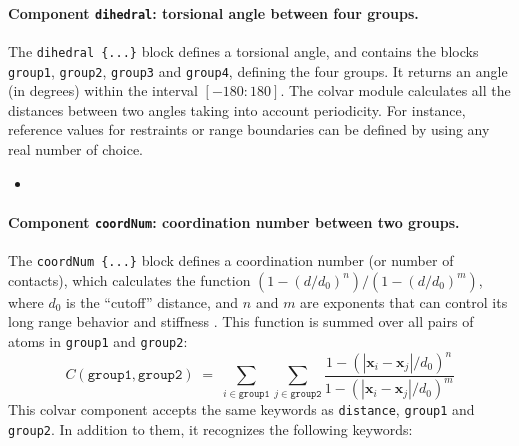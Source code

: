 \paragraph*{Component \texttt{dihedral}: torsional angle between four groups.}
The \texttt{dihedral~\{...\}} block defines a torsional angle, and
contains the blocks \texttt{group1}, \texttt{group2}, \texttt{group3}
and \texttt{group4}, defining the four groups.  It returns an angle
(in degrees) within the interval $[-180:180]$.  The colvar module
calculates all the distances between two angles taking into account
periodicity.  For instance, reference values for restraints or range
boundaries can be defined by using any real number of choice.
\begin{itemize}
\item {}
\end{itemize}


\paragraph*{Component \texttt{coordNum}: coordination number
  between two groups.}  The \texttt{coordNum \{...\}} block defines
a coordination number (or number of contacts), which calculates the
function $(1-(d/d_0)^{n})/(1-(d/d_0)^{m})$, where $d_0$ is the
``cutoff'' distance, and $n$ and $m$ are exponents that can control
its long range behavior and stiffness \cite{Iannuzzi2003}.  This
function is summed over all pairs of atoms in \texttt{group1} and
\texttt{group2}:
\begin{equation}
  \label{eq:cvc_coordNum}
  C (\mathtt{group1}, \mathtt{group2}) \; = \; 
  \sum_{i\in\mathtt{group1}}\sum_{j\in\mathtt{group2}} {
    \frac{1 - (|\mathbf{x}_{i}-\mathbf{x}_{j}|/d_{0})^{n}}{
      1 - (|\mathbf{x}_{i}-\mathbf{x}_{j}|/d_{0})^{m} }
  }
\end{equation}
This colvar component accepts the same keywords as \texttt{distance},
\texttt{group1} and \texttt{group2}.  In addition to them, it
recognizes the following keywords:

